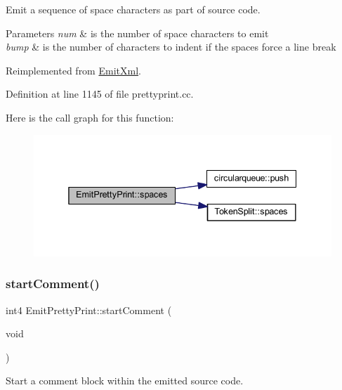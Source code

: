 Emit a sequence of space characters as part of source code. 


\begin{DoxyParams}{Parameters}
{\em num} & is the number of space characters to emit \\
\hline
{\em bump} & is the number of characters to indent if the spaces force a line break \\
\hline
\end{DoxyParams}


Reimplemented from \mbox{\hyperlink{class_emit_xml_ab2e3fc4934aade587c0b5a8706c9dfa0}{Emit\+Xml}}.



Definition at line 1145 of file prettyprint.\+cc.

Here is the call graph for this function\+:
\nopagebreak
\begin{figure}[H]
\begin{center}
\leavevmode
\includegraphics[width=338pt]{class_emit_pretty_print_aef02e9261ce7b7a96bceeae169512a3f_cgraph}
\end{center}
\end{figure}
\mbox{\label{class_emit_pretty_print_a922f3833eb9fd5f0aa04f2d0fe3e3540}} 
\subsubsection{\texorpdfstring{startComment()}{startComment()}}
{\footnotesize\ttfamily int4 Emit\+Pretty\+Print\+::start\+Comment (\begin{DoxyParamCaption}\item[{void}]{ }\end{DoxyParamCaption})\hspace{0.3cm}{\ttfamily [virtual]}}



Start a comment block within the emitted source code. 

